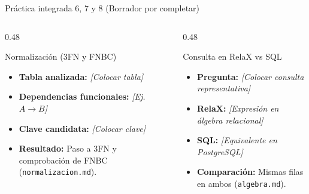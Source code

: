 \documentclass[aspectratio=169,11pt]{beamer}
\begin{document}
\begin{frame}{Práctica integrada 6, 7 y 8 \small\color{VerdeSuave}(Borrador por completar)}
  \begin{columns}[T,totalwidth=\textwidth]
    \begin{column}{0.48\textwidth}
      \begin{block}{Normalización (3FN y FNBC)}
        \begin{itemize}
          \item \textbf{Tabla analizada:} \textit{[Colocar tabla]}
          \item \textbf{Dependencias funcionales:} \textit{[Ej. $A \to B$]}
          \item \textbf{Clave candidata:} \textit{[Colocar clave]}
          \item \textbf{Resultado:} Paso a 3FN y comprobación de FNBC (\texttt{normalizacion.md}).
        \end{itemize}
      \end{block}
    \end{column}

    \begin{column}{0.48\textwidth}
      \begin{exampleblock}{Consulta en RelaX vs SQL}
        \begin{itemize}
          \item \textbf{Pregunta:} \textit{[Colocar consulta representativa]}
          \item \textbf{RelaX:} \textit{[Expresión en álgebra relacional]}
          \item \textbf{SQL:} \textit{[Equivalente en PostgreSQL]}
          \item \textbf{Comparación:} Mismas filas en ambos (\texttt{algebra.md}).
        \end{itemize}
      \end{exampleblock}
    \end{column}
  \end{columns}
\end{frame}
\end{document}
